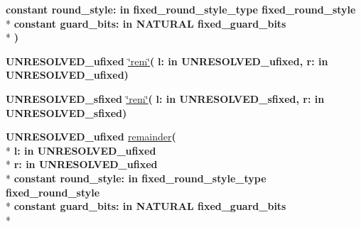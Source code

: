 \begin{DoxyCompactItemize}
{\bfseries {\bfseries \textcolor{keywordflow}{constant}\textcolor{vhdlchar}{ }}\textcolor{vhdlchar}{round\+\_\+style\+: }\textcolor{stringliteral}{in }\textcolor{vhdlchar}{fixed\+\_\+round\+\_\+style\+\_\+type     fixed\+\_\+round\+\_\+style}}\\*
{\bfseries {\bfseries \textcolor{keywordflow}{constant}\textcolor{vhdlchar}{ }}\textcolor{vhdlchar}{guard\+\_\+bits\+: }\textcolor{stringliteral}{in }\textcolor{vhdlchar}{N\+A\+T\+U\+R\+A\+L     fixed\+\_\+guard\+\_\+bits}}\\*
{\bfseries  )} 
\item 
{\bfseries {\bfseries \textcolor{vhdlchar}{U\+N\+R\+E\+S\+O\+L\+V\+E\+D\+\_\+ufixed}\textcolor{vhdlchar}{ }}} \hyperlink{class__fixed__pkg_ad1f795e1e3cf142cf7bb4dfb5b951869}{\char`\"{}rem\char`\"{}}{\bfseries  ( }{\bfseries \textcolor{vhdlchar}{l\+: }\textcolor{stringliteral}{in }\textcolor{vhdlchar}{U\+N\+R\+E\+S\+O\+L\+V\+E\+D\+\_\+ufixed}}{\bfseries  , \textcolor{vhdlchar}{r\+: }\textcolor{stringliteral}{in }\textcolor{vhdlchar}{U\+N\+R\+E\+S\+O\+L\+V\+E\+D\+\_\+ufixed}}{\bfseries  )} 
\item 
{\bfseries {\bfseries \textcolor{vhdlchar}{U\+N\+R\+E\+S\+O\+L\+V\+E\+D\+\_\+sfixed}\textcolor{vhdlchar}{ }}} \hyperlink{class__fixed__pkg_a456d29ab7e0ace8e29746cae8333c4a8}{\char`\"{}rem\char`\"{}}{\bfseries  ( }{\bfseries \textcolor{vhdlchar}{l\+: }\textcolor{stringliteral}{in }\textcolor{vhdlchar}{U\+N\+R\+E\+S\+O\+L\+V\+E\+D\+\_\+sfixed}}{\bfseries  , \textcolor{vhdlchar}{r\+: }\textcolor{stringliteral}{in }\textcolor{vhdlchar}{U\+N\+R\+E\+S\+O\+L\+V\+E\+D\+\_\+sfixed}}{\bfseries  )} 
\item 
{\bfseries {\bfseries \textcolor{vhdlchar}{U\+N\+R\+E\+S\+O\+L\+V\+E\+D\+\_\+ufixed}\textcolor{vhdlchar}{ }}} \hyperlink{class__fixed__pkg_a40206b01a0930b7fece3e755b512760a}{remainder}{\bfseries  ( }\\*
{\bfseries \textcolor{vhdlchar}{l\+: }\textcolor{stringliteral}{in }\textcolor{vhdlchar}{U\+N\+R\+E\+S\+O\+L\+V\+E\+D\+\_\+ufixed}}\\*
{\bfseries \textcolor{vhdlchar}{r\+: }\textcolor{stringliteral}{in }\textcolor{vhdlchar}{U\+N\+R\+E\+S\+O\+L\+V\+E\+D\+\_\+ufixed}}\\*
{\bfseries {\bfseries \textcolor{keywordflow}{constant}\textcolor{vhdlchar}{ }}\textcolor{vhdlchar}{round\+\_\+style\+: }\textcolor{stringliteral}{in }\textcolor{vhdlchar}{fixed\+\_\+round\+\_\+style\+\_\+type     fixed\+\_\+round\+\_\+style}}\\*
{\bfseries {\bfseries \textcolor{keywordflow}{constant}\textcolor{vhdlchar}{ }}\textcolor{vhdlchar}{guard\+\_\+bits\+: }\textcolor{stringliteral}{in }\textcolor{vhdlchar}{N\+A\+T\+U\+R\+A\+L     fixed\+\_\+guard\+\_\+bits}}\\*

\end{DoxyCompactItemize}
